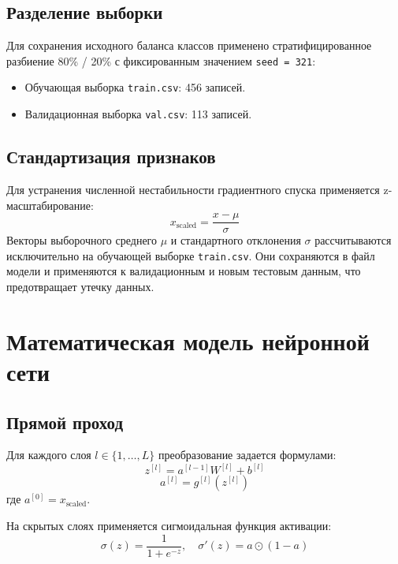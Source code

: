 \documentclass[a4paper,14pt]{extarticle}
\begin{document}
\subsection{Разделение выборки}

Для сохранения исходного баланса классов применено стратифицированное разбиение 80\% / 20\% с фиксированным значением \texttt{seed = 321}:
\begin{itemize}
    \item Обучающая выборка \texttt{train.csv}: 456 записей.
    \item Валидационная выборка \texttt{val.csv}: 113 записей.
\end{itemize}

\subsection{Стандартизация признаков}

Для устранения численной нестабильности градиентного спуска применяется z-масштабирование:
\begin{equation}
    x_{\text{scaled}} = \frac{x - \mu}{\sigma}
\end{equation}
Векторы выборочного среднего $\mu$ и стандартного отклонения $\sigma$ рассчитываются исключительно на обучающей выборке \texttt{train.csv}. Они сохраняются в файл модели и применяются к валидационным и новым тестовым данным, что предотвращает утечку данных.

\section{Математическая модель нейронной сети}

\subsection{Прямой проход}

Для каждого слоя $l \in \{1, \dots, L\}$ преобразование задается формулами:
\begin{equation}
    z^{[l]} = a^{[l-1]} W^{[l]} + b^{[l]}
\end{equation}
\begin{equation}
    a^{[l]} = g^{[l]}(z^{[l]})
\end{equation}
где $a^{[0]} = x_{\text{scaled}}$.

На скрытых слоях применяется сигмоидальная функция активации:
\begin{equation}
    \sigma(z) = \frac{1}{1 + e^{-z}}, \quad \sigma'(z) = a \odot (1 - a)
\end{equation}
\end{document}
